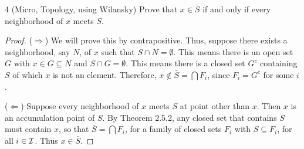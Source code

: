 \begin{exercise}{4 (Micro, Topology, using Wilansky)}
Prove that $x \in \bar{S}$ if and only if every neighborhood of $x$ meets $S$.
\end{exercise}
\begin{proof}
($\Rightarrow$)
We will prove this by contrapositive.
Thus, suppose there exists a neighborhood, say $N$, of $x$ such that $S \cap N = \emptyset$.
This means there is an open set $G$ with $x \in G \subseteq N$ and $S \cap G = \emptyset$.
This means there is a closed set $G^c$ containing $S$ of which $x$ is not an element.
Therefore, $x \notin \bar{S} = \bigcap F_i$, since $F_i = G^c$ for some $i$.

($\Leftarrow$)
Suppose every neighborhood of $x$ meets $S$ at point other than $x$.
Then $x$ is an accumulation point of $S$.
By Theorem 2.5.2, any closed set that contains $S$ must contain $x$, so that $\bar{S} = \bigcap F_i$, for a family of closed sets $F_i$ with $S \subseteq F_i$, for all $i \in \mathcal{I}$. 
Thus $x \in \bar{S}$.
\end{proof}


